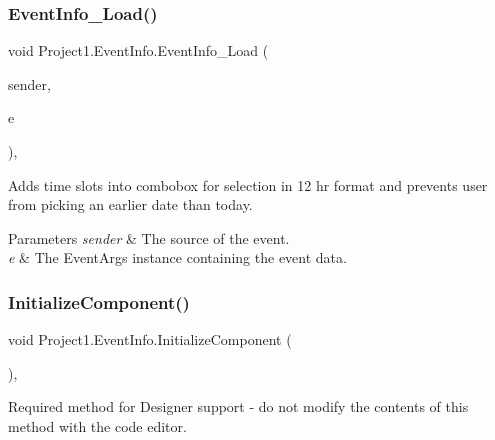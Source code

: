 \subsubsection{\texorpdfstring{Event\+Info\+\_\+\+Load()}{EventInfo\_Load()}}
{\footnotesize\ttfamily void Project1.\+Event\+Info.\+Event\+Info\+\_\+\+Load (\begin{DoxyParamCaption}\item[{object}]{sender,  }\item[{Event\+Args}]{e }\end{DoxyParamCaption})\hspace{0.3cm}{\ttfamily [inline]}, {\ttfamily [private]}}



Adds time slots into combobox for selection in 12 hr format and prevents user from picking an earlier date than today. 


\begin{DoxyParams}{Parameters}
{\em sender} & The source of the event.\\
\hline
{\em e} & The Event\+Args instance containing the event data.\\
\hline
\end{DoxyParams}
\mbox{\label{classProject1_1_1EventInfo_ad8918624e8ae88b80277a9c1b913b1c3}} 
\subsubsection{\texorpdfstring{Initialize\+Component()}{InitializeComponent()}}
{\footnotesize\ttfamily void Project1.\+Event\+Info.\+Initialize\+Component (\begin{DoxyParamCaption}{ }\end{DoxyParamCaption})\hspace{0.3cm}{\ttfamily [inline]}, {\ttfamily [private]}}



Required method for Designer support -\/ do not modify the contents of this method with the code editor. 

\mbox{\label{classProject1_1_1EventInfo_aaa2e7fde2f469c6769b8099941bd66d0}} 
